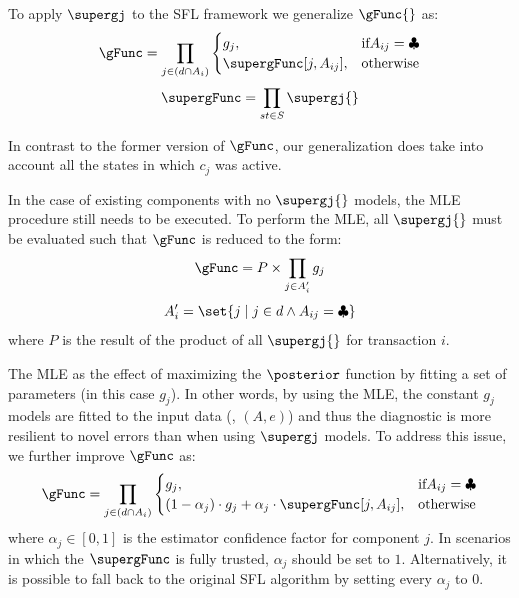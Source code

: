 To apply $\supergj$ to the \ac{SFL} framework we generalize $\gFunc{}$
as:
%
\begin{equation}
  \displaystyle \gFunc = \prod_{j \in (d \cap A_i)} \begin{cases}
    g_j, & \textrm{if} A_{ij} = \clubsuit\\
    \supergFunc[j,A_{ij}],& \textrm{otherwise}
  \end{cases}
\end{equation}
\begin{equation}
  \label{eq:nfge:supergFunc}
  \supergFunc = \prod_{st \in S} \supergj{}
\end{equation}

In contrast to the former version of $\gFunc$, our generalization does
take into account all the states in which $c_j$ was active.



In the case of existing components with no $\supergj{}$ models, the
\ac{MLE} procedure still needs to be executed.
%
To perform the \ac{MLE}, all $\supergj{}$ must be evaluated such that
$\gFunc$ is reduced to the form:
%
\begin{equation}
  \displaystyle \gFunc = P \times \prod_{j \in A_i^\prime} g_j
\end{equation}
\begin{equation}
  \displaystyle A_i^\prime = \set{j \mid  j\in d \wedge A_{ij}= \clubsuit}
\end{equation}
\noindent
where $P$ is the result of the product of all $\supergj{}$ for
transaction $i$.



The \ac{MLE} as the effect of maximizing the $\posterior$ function by
fitting a set of parameters (in this case $g_j$).
%
In other words, by using the \ac{MLE}, the constant $g_j$ models are
fitted to the input data (\ie, $(A,e)$) and thus the diagnostic is
more resilient to novel errors than when using $\supergj$ models.
%
To address this issue, we further improve $\gFunc$ as:
%
\begin{equation}
  \label{eq:nfge:alpha}
  \displaystyle \gFunc = \prod_{j \in (d \cap A_i)}
  \begin{cases}
    g_j, & \textrm{if} A_{ij} = \clubsuit\\
    (1-\alpha_j) \cdot g_j + \alpha_j \cdot \supergFunc[j,A_{ij}], & \textrm{otherwise}
  \end{cases}
\end{equation}
\noindent
where $\alpha_j \in [0,1]$ is the estimator confidence factor for
component $j$.
%
In scenarios in which the $\supergFunc$ is fully trusted, $\alpha_j$
should be set to $1$.
%
Alternatively, it is possible to fall back to the original \ac{SFL}
algorithm by setting every $\alpha_j$ to $0$.


